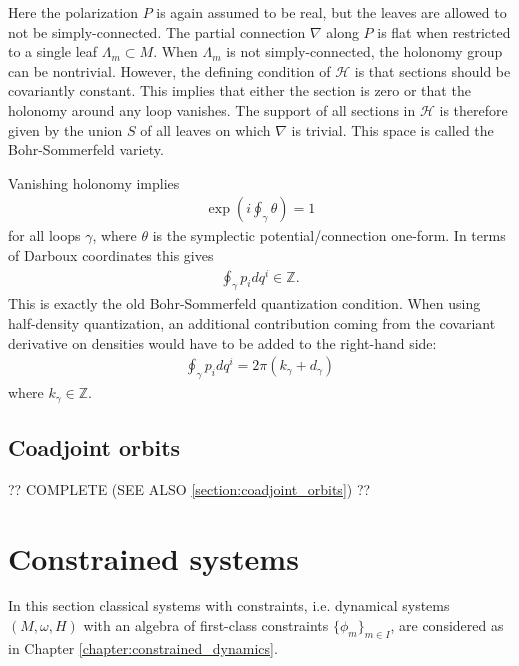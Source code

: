     \begin{method}
        Here the polarization $P$ is again assumed to be real, but the leaves are allowed to not be simply-connected. The partial connection $\nabla$ along $P$ is flat when restricted to a single leaf $\Lambda_m\subset M$. When $\Lambda_m$ is not simply-connected, the holonomy group can be nontrivial. However, the defining condition of $\mathcal{H}$ is that sections should be covariantly constant. This implies that either the section is zero or that the holonomy around any loop vanishes. The support of all sections in $\mathcal{H}$ is therefore given by the union $S$ of all leaves on which $\nabla$ is trivial. This space is called the Bohr-Sommerfeld variety.

        Vanishing holonomy implies
        \begin{gather}
            \exp\left(i\oint_\gamma\theta\right) = 1
        \end{gather}
        for all loops $\gamma$, where $\theta$ is the symplectic potential/connection one-form. In terms of Darboux coordinates this gives
        \begin{gather}
            \oint_\gamma p_idq^i\in\mathbb{Z}.
        \end{gather}
        This is exactly the old Bohr-Sommerfeld quantization condition. When using half-density quantization, an additional contribution coming from the covariant derivative on densities would have to be added to the right-hand side:
        \begin{gather}
            \oint_\gamma p_idq^i = 2\pi(k_\gamma + d_\gamma)
        \end{gather}
        where $k_\gamma\in\mathbb{Z}$.
    \end{method}

\subsection{Coadjoint orbits}

    ?? COMPLETE (SEE ALSO \ref{section:coadjoint_orbits}) ??

\section{Constrained systems}

    In this section classical systems with constraints, i.e. dynamical systems $(M,\omega,H)$ with an algebra of first-class constraints $\{\phi_m\}_{m\in I}$, are considered as in Chapter \ref{chapter:constrained_dynamics}.


